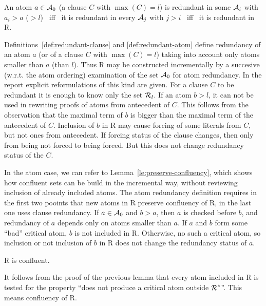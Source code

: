 \begin{LEMMA} \label{le:redundancy-limit}
An atom $a\in\mbox{$\cal A$}_0$ (a clause $C$ with \(\max(C)=l\)) is redundant in some
$\mbox{$\cal A$}_i$ with $a_i>a$ (\(>l\)) \ iff \ it is redundant in every $\mbox{$\cal A$}_j$ with
$j>i$ \ iff \ it is redundant in \C R.
\end{LEMMA}
\begin{PROOF}
Definitions~\ref{def:redundant-clause} and \ref{def:redundant-atom} define
redundancy of an atom $a$ (or of a clause $C$ with $\max(C)=l$) taking into
account only atoms smaller than $a$ (than $l$).  Thus \C R may be constructed
incrementally by a succesive (w.r.t. the atom ordering) examination of the set
$\mbox{$\cal A$}_0$ for atom redundancy. In the report \cite{S-A} explicit reformulations
of this kind are given. For a clause $C$ to be redundant it is enough to know
only the set \(\mbox{$\cal R$}_l\). If an atom \(b>l\), it can not be used in rewriting
proofs of atoms from antecedent of $C$. This follows from the observation that
the maximal term of $b$ is bigger than the maximal term of the antecedent of
$C$.  Inclusion of $b$ in \C R may cause forcing of some literals from $C$,
but not ones from antecedent. If forcing status of the clause changes, then
only from being not forced to being forced. But this does not change
redundancy status of the $C$.

In the atom case, we can refer to Lemma~\ref {le:preserve-confluency}, which
shows how confluent sets can be build in the incremental way, without
reviewing inclusion of already included atoms. The atom redundancy definition
requires in the first two pooints that new atoms in \C R preserve confluency
of \C R, in the last one uses clause redundancy. If \(a\in\mbox{$\cal A$}_0\) and
\(b>a\), then $a$ is checked before $b$, and redundancy of $a$ depends
only on atoms smaller than $a$. If $a$ and $b$ form some ``bad'' critical
atom, $b$ is not included in \C R. Otherwise, no such a critical atom, so
inclusion or not inclusion of $b$ in \C R does not change the redundancy
status of $a$.
\end{PROOF}

\begin{COROLLARY} \label{co:model-confluent}
\C R is confluent.
\end{COROLLARY}
\begin{PROOF}
It follows from the proof of the previous lemma that every atom included in \C
R is tested for the property ``does not produce a critical atom outside $\mbox{$\cal R$}^\ast$''.
This means confluency of \C R.  
\end{PROOF}

